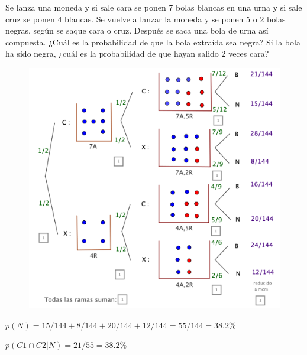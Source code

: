 \vspace{5mm}
\begin{ejemplo}
\begin{ejer}
Se lanza una moneda y si sale cara se ponen 7 bolas blancas en una urna y si sale cruz se ponen 4 blancas. Se vuelve a lanzar la moneda y se ponen 5 o 2 bolas negras, según se saque cara o cruz. Después se saca una bola de urna así compuesta. ¿Cuál es la probabilidad de que la bola extraída sea negra? Si la bola ha sido negra, ¿cuál es la probabilidad de que hayan salido 2 veces cara? 	
\end{ejer}
\end{ejemplo}
	\begin{figure}[H]
		\centering
		\includegraphics[width=1\textwidth]{imagenes/imagenes02/T02IM44.png}
	\end{figure}
	
$p(N)=15/144+8/144+20/144+12/144=55/144=38.2\%$

$p(C1\cap C2|N)=21/55=38.2\%$


